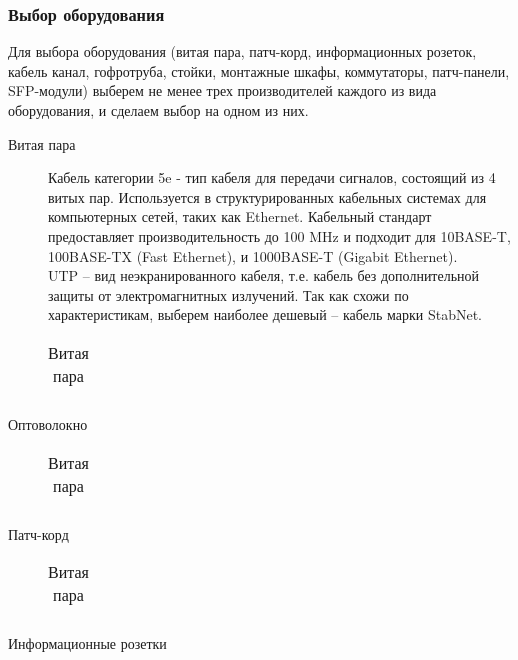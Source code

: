 \subsubsection{Выбор  оборудования}
Для выбора оборудования (витая пара, патч-корд, информационных розеток, кабель канал, гофротруба, стойки, монтажные шкафы, коммутаторы, патч-панели, SFP-модули) выберем не менее трех производителей каждого из вида оборудования, и сделаем выбор на одном из них.

\begin{description}
\item[Витая пара]
  Кабель категории 5e - тип кабеля для передачи сигналов, состоящий из 4 витых пар. Используется в структурированных кабельных системах для компьютерных сетей, таких как Ethernet. Кабельный стандарт предоставляет производительность до 100 MHz и подходит для 10BASE-T, 100BASE-TX (Fast Ethernet), и 1000BASE-T (Gigabit Ethernet).
\\UTP – вид неэкранированного кабеля, т.е. кабель без дополнительной защиты от электромагнитных излучений. 
Так как схожи по характеристикам, выберем наиболее дешевый – кабель марки StabNet.
  \begin{table}[!htbp]
    \centering
    \begin{tabular}{|p{1cm}|p{1cm}|p{5cm}|p{2cm}|p{2cm}|}
      \hline
      
    \end{tabular}
    \caption{Витая пара}
    \label{table:cabel}
  \end{table}
  
\item[Оптоволокно]
\begin{table}[!htbp]
    \centering
    \begin{tabular}{|p{1cm}|p{1cm}|p{5cm}|p{2cm}|p{2cm}|}
      \hline
      
    \end{tabular}
    \caption{Витая пара}
    \label{table:cabel}
  \end{table}
\item[Патч-корд]
\begin{table}[!htbp]
    \centering
    \begin{tabular}{|p{1cm}|p{1cm}|p{5cm}|p{2cm}|p{2cm}|}
      \hline
      
    \end{tabular}
    \caption{Витая пара}
    \label{table:cabel}
  \end{table}
\item[Информационные розетки]
\begin{table}[!htbp]
    \centering
    \begin{tabular}{|p{1cm}|p{1cm}|p{5cm}|p{2cm}|p{2cm}|}
      \hline
      

\end{tabular}
\end{table}
\end{description}
